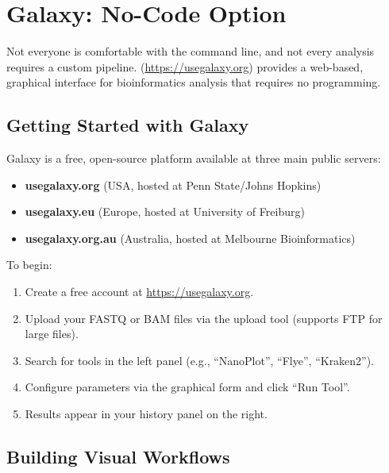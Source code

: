 \section{Galaxy: No-Code Option}
\label{sec:diyanalysis:galaxy}

Not everyone is comfortable with the command line, and not every analysis requires a custom pipeline.  (\url{https://usegalaxy.org}) provides a web-based, graphical interface for bioinformatics analysis that requires no programming.

\subsection{Getting Started with Galaxy}
\label{subsec:diyanalysis:galaxy_intro}

Galaxy is a free, open-source platform available at three main public servers:
\begin{itemize}[nosep]
  \item \textbf{usegalaxy.org} (USA, hosted at Penn State/Johns Hopkins)
  \item \textbf{usegalaxy.eu} (Europe, hosted at University of Freiburg)
  \item \textbf{usegalaxy.org.au} (Australia, hosted at Melbourne Bioinformatics)
\end{itemize}

To begin:
\begin{enumerate}[nosep]
  \item Create a free account at \url{https://usegalaxy.org}.
  \item Upload your \acrshort{FASTQ} or \acrshort{BAM} files via the upload tool (supports FTP for large files).
  \item Search for tools in the left panel (e.g., ``NanoPlot'', ``Flye'', ``Kraken2'').
  \item Configure parameters via the graphical form and click ``Run Tool''.
  \item Results appear in your history panel on the right.
\end{enumerate}

\subsection{Building Visual Workflows}
\label{subsec:diyanalysis:galaxy_workflows}

